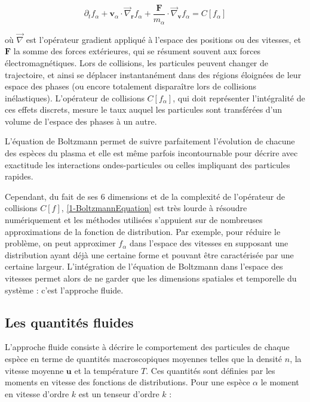 \begin{refsection}
\begin{equation}
\label{1-BoltzmannEquation}
\partial_tf_\alpha+\mathbf{v}_\alpha\cdot\vec\nabla_\mathbf{r}f_\alpha+
\frac{\mathbf{F}}{m_\alpha}\cdot\vec\nabla_{\mathbf{v}}f_\alpha
=C[f_\alpha]
\end{equation}

où $\vec\nabla$ est l'opérateur gradient appliqué à l'espace des positions ou
des vitesses, et $\mathbf{F}$ la somme des forces extérieures, qui se résument
souvent aux forces électromagnétiques. Lors de collisions, les particules peuvent changer de
trajectoire, et ainsi se déplacer instantanément dans des régions éloignées de leur espace des
phases (ou encore totalement disparaître lors de collisions inélastiques).
L'opérateur de collisions $C[f_\alpha]$, qui doit représenter l'intégralité de
ces effets discrets, mesure le taux auquel les particules sont transférées d'un
volume de l'espace des phases à un autre.

 L'équation de Boltzmann permet de
suivre parfaitement l'évolution de chacune des espèces du plasma et elle est
même parfois incontournable pour décrire avec exactitude les interactions
ondes-particules ou celles impliquant des particules rapides. 

Cependant, du fait de ses 6 dimensions et de la complexité de
l'opérateur de collisions $C[f]$, \eqref{1-BoltzmannEquation} est très
lourde à résoudre numériquement et les méthodes utilisées
s'appuient sur de nombreuses approximations de la fonction de
distribution\parencite{HagelaarHDR}. Par exemple, pour réduire le problème, on
peut approximer $f_\alpha$ dans l'espace des vitesses en supposant une
distribution ayant déjà une certaine forme et pouvant être caractérisée par une
certaine largeur. L'intégration de l'équation de Boltzmann dans l'espace des
vitesses permet alors de ne garder que les dimensions spatiales et temporelle
du système : c'est l'approche fluide.

\subsection{Les quantités fluides}
L'approche fluide consiste à décrire le comportement des particules de chaque
espèce en terme de quantités macroscopiques moyennes telles que la densité
$n$, la vitesse moyenne $\mathbf u$ et la température $T$.
Ces quantités sont définies par les moments en vitesse des fonctions de
distributions.
Pour une espèce $\alpha$ le moment en vitesse d'ordre $k$ est un tenseur d'ordre
$k$ :


\end{refsection}
